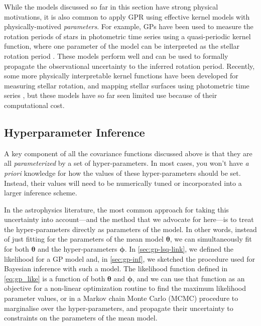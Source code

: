 \documentclass[letterpaper]{ar-1col}
\newcommand{\suz}[1]{\textcolor{magenta}{#1}}
\newcommand{\hyperparams}{\ensuremath{\boldsymbol{\phi}}}
\newcommand{\meanparams}{\ensuremath{\boldsymbol{\theta}}}
\begin{document}
While the models discussed so far in this section have strong physical motivations, it is also common to apply GPR using effective kernel models with physically-motived \emph{parameters}.
For example, GPs have been used to measure the rotation periods of stars in photometric time series using a quasi-periodic kernel function, where one parameter of the model can be interpreted as the stellar rotation period \citep{2018MNRAS.474.2094A, 2020MNRAS.492.1008G}.
These models perform well and can be used to formally propagate the observational uncertainty to the inferred rotation period.
Recently, some more physically interpretable kernel functions have been developed for measuring stellar rotation, and mapping stellar surfaces using photometric time series \citep{2021AJ....162..124L}, but these models have so far seen limited use because of their computational cost.


\subsection{Hyperparameter Inference}\label{sec:inference}

A key component of all the covariance functions discussed above is that they are all \emph{parameterized} by a set of hyper-parameters.
In most cases, you won't have \emph{a priori} knowledge for how the values of these hyper-parameters should be set.
Instead, their values will need to be numerically tuned or incorporated into a larger inference scheme.

In the astrophysics literature, the most common approach for taking this uncertainty into account---and the method that we advocate for here---is to treat the hyper-parameters directly as parameters of the model.
In other words, instead of just fitting for the parameters of the mean model $\meanparams$, we can simultaneously fit for both $\meanparams$ and the hyper-parameters $\hyperparams$.
In \autoref{sec:gp-lsq-link}, we defined the likelihood for a GP model and, in \autoref{sec:gp-inf}, we sketched the procedure used for Bayesian inference with such a model.
The likelihood function defined in \autoref{eq:gp_like} is a function of both $\meanparams$ and $\hyperparams$, and we can use that function as an objective for a non-linear optimization routine to find the maximum likelihood parameter values, or in a Markov chain Monte Carlo (MCMC) procedure to marginalise over the hyper-parameters, and propagate their uncertainty to constraints on the parameters of the mean model.
\end{document}

